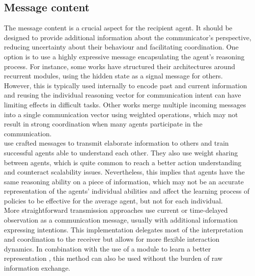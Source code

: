 \documentclass[a4paper,singleside,12pt]{report} %
\begin{document}
\subsection{Message content}\label{message-content}
The message content is a crucial aspect for the recipient agent. It should be designed to provide additional information about the communicator's perspective, reducing uncertainty about their behaviour and facilitating coordination. One option is to use a highly expressive message encapsulating the agent's reasoning process. For instance, some works \cite{Sukhbaatar2016LearningMC, Singh2018LearningWT, Das2018TarMACTM, Peng2017MultiagentBN} have structured their architectures around recurrent modules, using the hidden state as a signal message for others. However, this is typically used internally to encode past and current information and reusing the individual reasoning vector for communication intent can have limiting effects in difficult tasks. Other works \cite{Sukhbaatar2016LearningMC, Singh2018LearningWT} merge multiple incoming messages into a single communication vector using weighted operations, which may not result in strong coordination when many agents participate in the communication.\\
\cite{Das2018TarMACTM, Jiang2018LearningAC} use crafted messages to transmit elaborate information to others and train successful agents able to understand each other. They also use weight sharing between agents, which is quite common \cite{Kim2021CommunicationIM, Das2018TarMACTM, Peng2017MultiagentBN, Jiang2018LearningAC} to reach a better action understanding and counteract scalability issues. Nevertheless, this implies that agents have the same reasoning ability on a piece of information, which may not be an accurate representation of the agents' individual abilities and affect the learning process of policies to be effective for the average agent, but not for each individual.\\
More straightforward transmission approaches \cite{Liu2020When2comMP, Kim2021CommunicationIM} use current or time-delayed observation as a communication message, usually with additional information expressing intentions. This implementation delegates most of the interpretation and coordination to the receiver but allows for more flexible interaction dynamics. In combination with the use of a module to learn a better representation \cite{Lin2021LearningTG}, this method can also be used without the burden of raw information exchange.\\
\end{document}
